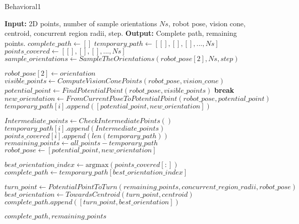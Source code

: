 \begin{algorithm}
    \caption{Behavioral1}
    \begin{algorithmic}[1]
        \Statex \textbf{Input:} 2D points, number of sample orientations $Ns$, robot pose, vision cone, centroid, concurrent region radii, step.
        \Statex \textbf{Output:} Complete path, remaining points.
        \newline
        \State $complete\_path \gets []$
        \State $temporary\_path \gets [[], [], [], ..., Ns]$
        \State $points\_covered \gets [[], [], [], ..., Ns]$
        \State $sample\_orientations \gets SampleTheOrientations(robot\_pose[2], Ns, step)$
        
            \State $robot\_pose[2] \gets orientation$
                \State $visible\_points \gets ComputeVisionConePoints(robot\_pose, vision\_cone)$
                \State $potential\_point \gets FindPotentialPoint(robot\_pose, visible\_points)$
                \State \textbf{break}
                \EndIf
                \State $new\_orientation \gets FromCurrentPoseToPotentialPoint(robot\_pose, potential\_point)$
                \State $temporary\_path[i].append([potential\_point, new\_orientation])$

                \State $Intermediate\_points \gets CheckIntermediatePoints()$
                \State $temporary\_path[i].append(Intermediate\_points)$
                \State $points\_covered[i].append(len(temporary\_path))$
                \State $remaining\_points \gets all\_points - temporary\_path$
                \State $robot\_pose \gets [potential\_point, new\_orientation]$
            \EndWhile
        \EndFor
        
        \State $best\_orientation\_index \gets \text{argmax}(points\_covered[:])$
        \State $complete\_path \gets temporary\_path[best\_orientation\_index]$
        
        \State $turn\_point \gets PotentialPointToTurn(remaining\_points, concurrent\_region\_radii, robot\_pose)$
        \State $best\_orientation \gets TowardsCentroid(turn\_point, centroid)$
        \State $complete\_path.append([turn\_point, best\_orientation])$
        
        \State \Return $complete\_path, remaining\_points$
    \end{algorithmic}
\end{algorithm}

